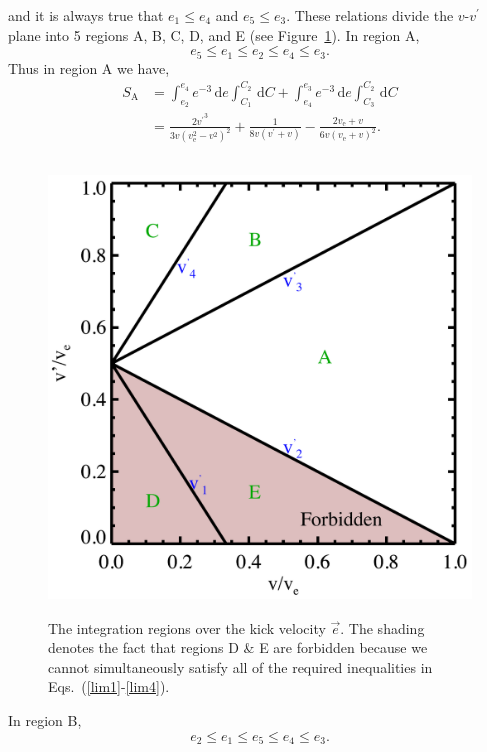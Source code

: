\documentclass[aps,floatfix,prd,showpacs]{revtex4}
\newcommand{\diff}{\mathrm{d}}
\newcommand{\vesc}{v_{\text{e}}}
\newcommand{\vp}{v^\prime}
\newcommand{\SA}{S_{\text{A}}}
\begin{document}
%
%
and it is always true that $e_1 \le e_4$ and $e_5 \le e_3$. These relations divide the $v$-$ \vp$ plane into 5 regions A, B, C, D, and E (see Figure~\ref{regions}). In region A,
%
\begin{equation}
e_5 \le e_1 \le e_2 \le e_4 \le e_3. 
\end{equation} 
%
%
Thus in region A we have,
%
\begin{equation}
\begin{split}
\SA & = \int^{e_4}_{e_2}{e^{-3}}\,\diff e\int^{C_2}_{C_1}\,\diff C + \int^{e_3}_{e_4}{e^{-3}}\,\diff e\int^{C_2}_{C_3}\,\diff C \\
& = \frac{2{\vp}^3}{3v(\vesc^2 - v^2)^2} + \frac{1}{8v(\vp + v)} - \frac{2\vesc + v}{6v(\vesc + v)^2}.
\end{split}
\end{equation}
%
%
%
\begin{figure}[htp]
\centering
\includegraphics[width=12cm, height=12cm]{regions}
\caption{The integration regions over the kick velocity $\vec{e}$. The shading denotes the fact that regions D \& E are forbidden because we cannot simultaneously satisfy all of the required inequalities in Eqs.~(\ref{lim1}-\ref{lim4}).}
\label{regions}
\end{figure}
%
%
In region B,
%
\begin{equation}
e_2 \le e_1 \le e_5 \le e_4 \le e_3.
\end{equation}
\end{document}
